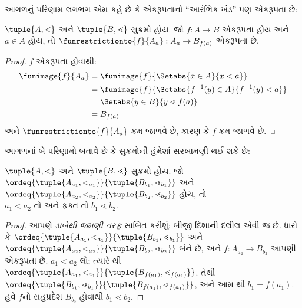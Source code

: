 આગળનું પરિણામ લગભગ એમ કહે છે કે એકરૂપતાનો
“આરંભિક ખંડ” પણ એકરૂપતા છે:

\begin{lem}
$\tuple{A, <}$ અને $\tuple{B, \lessdot}$ સુક્રમો હોય.
જો $f
\colon A \to B$ એકરૂપતા હોય અને $a \in A$ હોય,
તો $\funrestrictionto{f}{A_{a}} : A_a \to B_{f(a)}$
એકરૂપતા છે.
\end{lem}

\begin{proof}
$f$ એકરૂપતા હોવાથી:
\begin{align*}
	\funimage{f}{A_a} &= \funimage{f}{\Setabs{x \in A}{x < a}}\\
	&= \funimage{f}{\Setabs{f^{-1}(y) \in A}{f^{-1}(y) < a}} \\
	&= \Setabs{y \in B}{y \lessdot f(a)} \\
	&=B_{f(a)} 
\end{align*}
અને $\funrestrictionto{f}{A_a}$ ક્રમ જાળવે છે,
કારણ કે $f$ ક્રમ જાળવે છે.
\end{proof}

આગળનાં બે પરિણામો બતાવે છે કે સુક્રમોની હંમેશાં
સરખામણી થઈ શકે છે:

\begin{lem}
$\tuple{A, <}$ અને $\tuple{B, \lessdot}$ સુક્રમો હોય.
જો
$\ordeq{\tuple{A_{a_1}, <_{a_1}}}{\tuple{B_{b_1}, \lessdot_{b_1}}}$
અને
$\ordeq{\tuple{A_{{a_2}}, <_{a_2}}}{\tuple{B_{{b_2}},
\lessdot_{b_2}}}$ હોય, તો
$ {a_1}  < {a_2} \text{ તો અને ફક્ત તો }{b_1} \lessdot
{b_2}$.
\end{lem}

\begin{proof}
આપણે \emph{ડાબેથી જમણી તરફ} સાબિત કરીશું;
બીજી દિશાની દલીલ એવી જ છે.
ધારો કે
$\ordeq{\tuple{A_{a_1}, <_{a_1}}}{\tuple{B_{b_1},
\lessdot_{b_1}}}$ અને
$\ordeq{\tuple{A_{{a_2}},
<_{a_2}}}{\tuple{B_{{b_2}}, \lessdot_{b_2}}}$ બંને છે,
અને $f \colon
A_{{a_2}} \to B_{{b_2}}$ આપણી એકરૂપતા છે.
$ {a_1} < {a_2}$ લો; ત્યારે
થી
$\ordeq{\tuple{A_{a_1}, <_{a_1}}}{\tuple{B_{f({a_1})},
\lessdot_{f({a_1})}}}$.
તેથી
$\ordeq{\tuple{B_{b_1}, \lessdot_{b_1}}}{\tuple{B_{f({a_1})},
\lessdot_{f({a_1})}}}$, અને આમ
થી
$ {b_1} = f({a_1})$.
હવે $f$નો સહપ્રદેશ $B_{{b_2}}$ હોવાથી
$ {b_1} \lessdot {b_2}$.
\end{proof}

